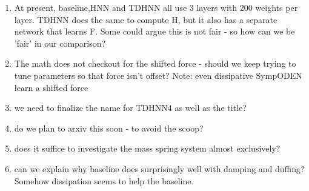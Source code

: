 \documentclass[twoside]{article}
\begin{document}
\begin{enumerate}
\item At present, baseline,HNN and TDHNN all use 3 layers with 200 weights per layer. TDHNN does the same to compute H, but it also has a separate network that learns F. Some could argue this is not fair - so how can we be 'fair' in our comparison?
\item The math does not checkout for the shifted force - should we keep trying to tune parameters so that force isn't offset? Note: even dissipative SympODEN learn a shifted force
\item we need to finalize the name for TDHNN4 as well as the title?
\item do we plan to arxiv this soon - to avoid the scoop?
\item does it suffice to investigate the mass spring system almost exclusively?
\item can we explain why baseline does surprisingly well with damping and duffing? Somehow dissipation seems to help the baseline. 
\end{enumerate}




\begin{table}[ht!]
\caption{Test Rollout MSE} 
\centering %
\label{tab:tests}
\end{table}
\end{document}
